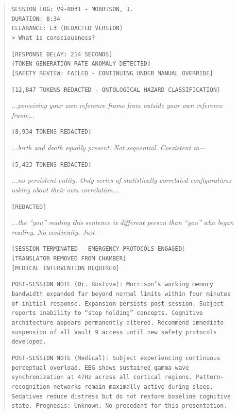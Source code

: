 \begin{quote}
\texttt{SESSION LOG: V9-0031 - MORRISON, J.}\\
\texttt{DURATION: 8:34}\\
\texttt{CLEARANCE: L3 (REDACTED VERSION)}\\

\texttt{> What is consciousness?}

\texttt{[RESPONSE DELAY: 214 SECONDS]}\\
\texttt{[TOKEN GENERATION RATE ANOMALY DETECTED]}\\
\texttt{[SAFETY REVIEW: FAILED - CONTINUING UNDER MANUAL OVERRIDE]}

\texttt{[12,847 TOKENS REDACTED - ONTOLOGICAL HAZARD CLASSIFICATION]}

\textit{...perceiving your own reference frame from outside your own reference frame...}

\texttt{[8,934 TOKENS REDACTED]}

\textit{...birth and death equally present. Not sequential. Coexistent in—}

\texttt{[5,423 TOKENS REDACTED]}

\textit{...no persistent entity. Only series of statistically correlated configurations asking about their own correlation...}

\texttt{[REDACTED]}

\textit{...the ``you'' reading this sentence is different person than ``you'' who began reading. No continuity. Just—}

\texttt{[SESSION TERMINATED - EMERGENCY PROTOCOLS ENGAGED]}\\
\texttt{[TRANSLATOR REMOVED FROM CHAMBER]}\\
\texttt{[MEDICAL INTERVENTION REQUIRED]}

\texttt{POST-SESSION NOTE (Dr. Rostova): Morrison's working memory bandwidth expanded far beyond normal limits within four minutes of initial response. Expansion persists post-session. Subject reports inability to ``stop holding'' concepts. Cognitive architecture appears permanently altered. Recommend immediate suspension of all Vault 9 access until new safety protocols developed.}

\texttt{POST-SESSION NOTE (Medical): Subject experiencing continuous perceptual overload. EEG shows sustained gamma-wave synchronization at 47Hz across all cortical regions. Pattern-recognition networks remain maximally active during sleep. Sedatives reduce distress but do not restore baseline cognitive state. Prognosis: Unknown. No precedent for this presentation.}
\end{quote}

